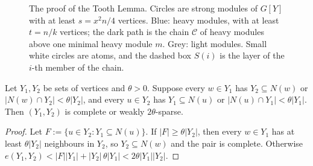\begin{figure}[ht]
\caption{The proof of the Tooth Lemma. Circles are strong modules of $G[Y]$ with at least $s=x^2n/4$
vertices. Blue: heavy modules, with at least $t=n/k$ vertices; the dark path is the chain $\mathcal C$ of
heavy modules above one minimal heavy module $m$. Grey: light modules. Small white circles are atoms,
and the dashed box $S(i)$ is the layer of the $i$-th member of the chain.}
\label{fig:tooth}
\end{figure}

\begin{lemma}\label{lem:pair}
Let $Y_1,Y_2$ be sets of vertices and $\theta>0$. Suppose every $w\in Y_1$ has
$Y_2\subseteq N(w)$ or $|N(w)\cap Y_2|<\theta|Y_2|$, and every $u\in Y_2$ has $Y_1\subseteq N(u)$ or
$|N(u)\cap Y_1|<\theta|Y_1|$. Then $(Y_1,Y_2)$ is complete or weakly $2\theta$-sparse.
\end{lemma}
\begin{proof}
Let $F:=\{u\in Y_2:Y_1\subseteq N(u)\}$. If $|F|\ge\theta|Y_2|$, then every $w\in Y_1$ has at least
$\theta|Y_2|$ neighbours in $Y_2$, so $Y_2\subseteq N(w)$ and the pair is complete. Otherwise
$e(Y_1,Y_2)<|F||Y_1|+|Y_2|\,\theta|Y_1|<2\theta|Y_1||Y_2|$.
\end{proof}
